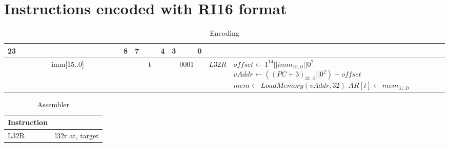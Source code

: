 \section{Instructions encoded with RI16 format}
\begin{smalltables}
	\begin{longtable}{llllllllllllllllllllllll  p{1cm}  p{7cm} | }
		\caption{Encoding\label{long}}\\
		23 & & & & & & & & & & & & & & & 8 & 7 & & & 4 & 3 & & & 0 & &
		\multicolumn{1}{c}{}\\
		\hline
		\multicolumn{16}{|c|}{imm[15..0]} & \multicolumn{4}{c|}{t} & \multicolumn{4}{c|}{0001} & \multicolumn{1}{c|}{$L32R$} & $offset \leftarrow 1^{14}||imm_{15..0}||0^2$ \newline $vAddr \leftarrow ((PC + 3)_{31..2}||0^2) + offset$ \newline $mem \leftarrow LoadMemory(vAddr, 32)$ \newline $AR[t] \leftarrow mem_{31..0}$\\ \hline
	\end{longtable}

	\begin{longtable}{|p{5cm}|p{5cm}|}
		\caption{Assembler\label{long}}\\
		\hline
		Instruction & \\
		\hline
		L32R & l32r at, target\\ \hline
	\end{longtable}
\end{smalltables}